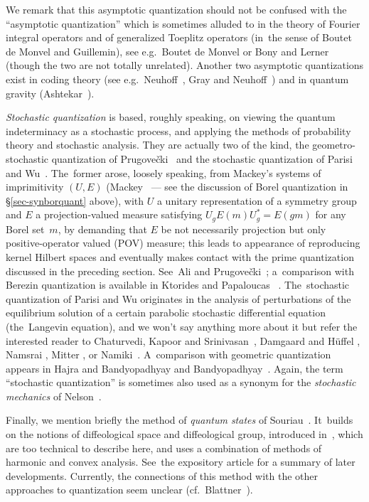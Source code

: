 \documentclass[11pt]{amsart}
\numberwithin{equation}{section}
\theoremstyle{remark}
\begin{document}
We remark that this asymptotic quantization should not be confused with the
``asymptotic quantization'' which is sometimes alluded to in the theory of
Fourier integral operators and of generalized Toeplitz operators (in~the sense
of Boutet de Monvel and Guillemin), see e.g.~Boutet de Monvel \cite{bib:BdM} or
Bony and Lerner~\cite{bib:BLe} (though the two are not totally unrelated).
Another two asymptotic quantizations exist in coding theory (see
e.g.~Neuhoff~\cite{bib:Neuhof}, Gray and Neuhoff~\cite{bib:+GrNeu}) and in
quantum gravity (Ashtekar~\cite{bib:Ashte}).

{\sl Stochastic quantization\/} is based, roughly speaking, on viewing the
quantum indeterminacy as a stochastic process, and applying the methods of
probability theory and stochastic analysis. They are actually two of the kind,
the geometro-stochastic quantization of Prugove\v cki~\cite{bib:Prug} and the
stochastic quantization of Parisi and Wu~\cite{bib:PaWu}. The~former arose,
loosely speaking, from Mackey's systems of imprimitivity $(U,E)$
(Mackey~\cite{bib:Mack} --- see the discussion of Borel quantization in
\S\ref{sec-synborquant} above), with $U$ a unitary representation of a symmetry
group and $E$ a projection-valued measure satisfying $U_g E(m) U^*_g =E(gm)$
for any Borel set~$m$, by demanding that $E$ be not necessarily projection but
only positive-operator valued (POV) measure; this leads to appearance of
reproducing kernel Hilbert spaces and eventually makes contact with the prime
quantization discussed in the preceding section. See~Ali and Prugove\v
cki~\cite{bib:AliPr}; a~comparison with Berezin quantization is available in
Ktorides and Papaloucas~ \cite{bib:KtoP}. The~stochastic quantization of Parisi
and Wu originates in the analysis of perturbations of the equilibrium solution
of a certain parabolic stochastic differential equation (the~Langevin
equation), and we won't say anything more about it but refer the interested
reader to Chaturvedi, Kapoor and Srinivasan~\cite{bib:ChKS}, Damgaard and
H\"uffel \cite{bib:Damg}, Namsrai \cite{bib:Namsr}, Mitter \cite{bib:Mitt},
or Namiki~\cite{bib:Namik}. A~comparison with geometric quantization appears in
Hajra and Bandyopadhyay \cite{bib:HajBan} and Bandyopadhyay~\cite{bib:+Bandy}.
Again, the term ``stochastic quantization'' is sometimes also used as a synonym
for the {\sl stochastic mechanics\/} of Nelson~\cite{bib:NelsM}.

Finally, we mention briefly the method of {\sl quantum states\/} of
Souriau~\cite{bib:SouQS}. It~builds on the notions of diffeological space and
diffeological group, introduced in~\cite{bib:SouDfg}, which are too technical
to describe here, and uses a combination of methods of harmonic and convex
analysis. See~the expository article \cite{bib:SouExp} for a summary of later
developments. Currently, the connections of this method with the other
approaches to quantization seem unclear (cf.~Blattner~\cite{bib:Blatt}).
\end{document}
